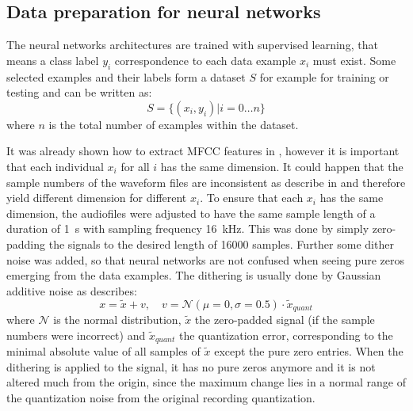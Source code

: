 
\subsection{Data preparation for neural networks}\label{sec:exp_data_prep}
The neural networks architectures are trained with supervised learning, that means a class label $y_i$ correspondence to each data example $x_i$ must exist.
Some selected examples and their labels form a dataset $S$ for example for training or testing and can be written as:
\begin{equation}\label{eq:exp_dataset}
  S = \{ (x_i, y_i) | i = 0 \dots n \}
\end{equation}
where $n$ is the total number of examples within the dataset.

It was already shown how to extract MFCC features in , however it is important that each individual $x_i$ for all $i$ has the same dimension.
It could happen that the sample numbers of the waveform files are inconsistent as describe in  and therefore yield different dimension for different $x_i$.
To ensure that each $x_i$ has the same dimension, the audiofiles were adjusted to have the same sample length of a duration of \SI{1}{\second} with sampling frequency \SI{16}{\kilo\hertz}.
This was done by simply zero-padding the signals to the desired length of 16000 samples.
Further some dither noise was added, so that neural networks are not confused when seeing pure zeros emerging from the data examples.
The dithering is usually done by Gaussian additive noise as describes:
\begin{equation}\label{eq:exp_dither}
  x = \tilde{x} + v, \quad v = \mathcal{N}(\mu=0, \sigma=0.5) \cdot \tilde{x}_{quant}%
\end{equation}
where $\mathcal{N}$ is the normal distribution, $\tilde{x}$ the zero-padded signal (if the sample numbers were incorrect) and $\tilde{x}_{quant}$ the quantization error, corresponding to the minimal absolute value of all samples of $\tilde{x}$ except the pure zero entries.
When the dithering is applied to the signal, it has no pure zeros anymore and it is not altered much from the origin, since the maximum change lies in a normal range of the quantization noise from the original recording quantization.

